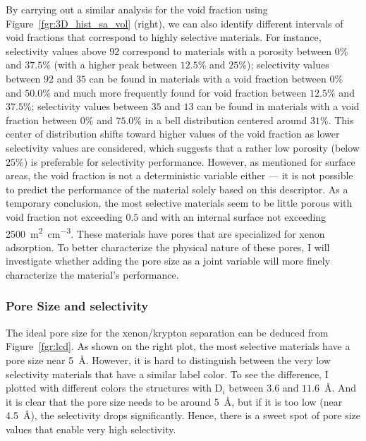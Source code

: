 \documentclass[main.tex]{subfiles}
\begin{document}
By carrying out a similar analysis for the void fraction using Figure~\ref{fgr:3D_hist_sa_vol} (right), we can also identify different intervals of void fractions that correspond to highly selective materials. For instance, selectivity values above $92$ correspond to materials with a porosity between {$0$\%} and {$37.5$\%} (with a higher peak between {$12.5$\%} and {$25$\%}); selectivity values between $92$ and $35$ can be found in materials with a void fraction between {$0$\%} and {$50.0$\%} and much more frequently found for void fraction between {$12.5$\%} and {$37.5$\%}; selectivity values between $35$ and $13$ can be found in materials with a void fraction between {$0$\%} and {$75.0$\%} in a bell distribution centered around {$31$\%}. This center of distribution shifts toward higher values of the void fraction as lower selectivity values are considered, which suggests that a rather low porosity (below {$25$\%}) is preferable for selectivity performance. However, as mentioned for surface areas, the void fraction is not a deterministic variable either — it is not possible to predict the performance of the material solely based on this descriptor. As a temporary conclusion, the most selective materials seem to be little porous with void fraction not exceeding $0.5$ and with an internal surface not exceeding \SI{2500}{\square\m\per\cubic\cm}. These materials have pores that are specialized for xenon adsorption. To better characterize the physical nature of these pores, I will investigate whether adding the pore size as a joint variable will more finely characterize the material's performance. 

\subsubsection{Pore Size and selectivity}

The ideal pore size for the xenon/krypton separation can be deduced from Figure~\ref{fgr:lcd}. As shown on the right plot, the most selective materials have a pore size near \SI{5}{\angstrom}. However, it is hard to distinguish between the very low selectivity materials that have a similar label color. To see the difference, I plotted with different colors the structures with D$_i$ between $3.6$ and $11.6$~\si{\angstrom}. And it is clear that the pore size needs to be around \SI{5}{\angstrom}, but if it is too low (near \SI{4.5}{\angstrom}), the selectivity drops significantly. Hence, there is a sweet spot of pore size values that enable very high selectivity.
\end{document}

